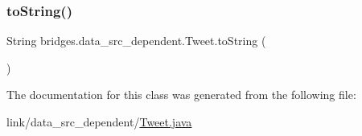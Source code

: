 \hypertarget{classbridges_1_1data__src__dependent_1_1_tweet_adfba67504a7463a7f16aff46d2bb893f}{}\label{classbridges_1_1data__src__dependent_1_1_tweet_adfba67504a7463a7f16aff46d2bb893f} 
\subsubsection{\texorpdfstring{to\+String()}{toString()}}
{\footnotesize\ttfamily String bridges.\+data\+\_\+src\+\_\+dependent.\+Tweet.\+to\+String (\begin{DoxyParamCaption}{ }\end{DoxyParamCaption})}



The documentation for this class was generated from the following file\+:\begin{DoxyCompactItemize}
\item 
link/data\+\_\+src\+\_\+dependent/\hyperlink{_tweet_8java}{Tweet.\+java}\end{DoxyCompactItemize}
